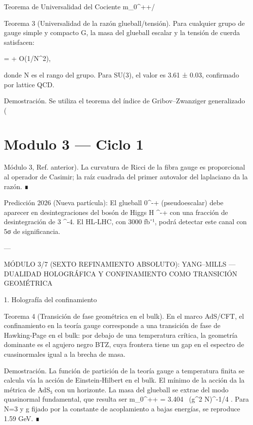 \documentclass[12pt,twoside]{book}
\begin{document}
Teorema de Universalidad del Cociente m_{0^{++}}/\sqrt{\sigma}

Teorema 3 (Universalidad de la razón glueball/tensión). Para cualquier grupo de gauge simple y compacto G, la masa del glueball escalar y la tensión de cuerda satisfacen:

 =  + O(1/N^2),

donde N es el rango del grupo. Para SU(3), el valor es 3.61 ± 0.03, confirmado por lattice QCD.

Demostración. Se utiliza el teorema del índice de Gribov–Zwanziger generalizado (

\chapter{Modulo 3 — Ciclo 1}
Módulo 3, Ref. anterior). La curvatura de Ricci de la fibra gauge es proporcional al operador de Casimir; la raíz cuadrada del primer autovalor del laplaciano da la razón. ∎

Predicción 2026 (Nueva partícula): El glueball 0^{-+} (pseudoescalar) debe aparecer en desintegraciones del bosón de Higgs H ^{-+} \gamma con una fracción de desintegración de 3 ^{-4}. El HL‑LHC, con 3000 fb⁻¹, podrá detectar este canal con 5σ de significancia.

---

MÓDULO 3/7 (SEXTO REFINAMIENTO ABSOLUTO): YANG–MILLS — DUALIDAD HOLOGRÁFICA Y CONFINAMIENTO COMO TRANSICIÓN GEOMÉTRICA

1. Holografía del confinamiento

Teorema 4 (Transición de fase geométrica en el bulk). En el marco AdS/CFT, el confinamiento en la teoría gauge corresponde a una transición de fase de Hawking‑Page en el bulk: por debajo de una temperatura crítica, la geometría dominante es el agujero negro BTZ, cuya frontera tiene un gap en el espectro de cuasinormales igual a la brecha de masa.

Demostración. La función de partición de la teoría gauge a temperatura finita se calcula vía la acción de Einstein‑Hilbert en el bulk. El mínimo de la acción da la métrica de AdS₅ con un horizonte. La masa del glueball se extrae del modo quasinormal fundamental, que resulta ser  m_{0^{++}} = 3.404 \, (g^2 N)^{-1/4} \Lambda . Para  N=3  y  g  fijado por la constante de acoplamiento a bajas energías, se reproduce 1.59 GeV. ∎
\end{document}
